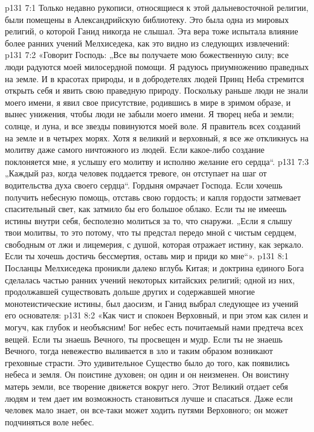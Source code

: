 \vs p131 7:1 Только недавно рукописи, относящиеся к этой дальневосточной религии, были помещены в Александрийскую библиотеку. Это была одна из мировых религий, о которой Ганид никогда не слышал. Эта вера тоже испытала влияние более ранних учений Мелхиседека, как это видно из следующих извлечений:
\vs p131 7:2 \pc «Говорит Господь: „Все вы получаете мою божественную силу; все люди радуются моей милосердной помощи. Я радуюсь приумножению праведных на земле. И в красотах природы, и в добродетелях людей Принц Неба стремится открыть себя и явить свою праведную природу. Поскольку раньше люди не знали моего имени, я явил свое присутствие, родившись в мире в зримом образе, и вынес унижения, чтобы люди не забыли моего имени. Я творец неба и земли; солнце, и луна, и все звезды повинуются моей воле. Я правитель всех созданий на земле и в четырех морях. Хотя я великий и верховный, я все же откликнусь на молитву даже самого ничтожного из людей. Если какое\hyp{}либо создание поклоняется мне, я услышу его молитву и исполню желание его сердца“.
\vs p131 7:3 „Каждый раз, когда человек поддается тревоге, он отступает на шаг от водительства духа своего сердца“. Гордыня омрачает Господа. Если хочешь получить небесную помощь, отставь свою гордость; и капля гордости затмевает спасительный свет, как затмило бы его большое облако. Если ты не имеешь истины внутри себя, бесполезно молиться за то, что снаружи. „Если я слышу твои молитвы, то это потому, что ты предстал передо мной с чистым сердцем, свободным от лжи и лицемерия, с душой, которая отражает истину, как зеркало. Если ты хочешь достичь бессмертия, оставь мир и приди ко мне“».
\vs p131 8:1 Посланцы Мелхиседека проникли далеко вглубь Китая; и доктрина единого Бога сделалась частью ранних учений некоторых китайских религий; одной из них, продолжавшей существовать дольше других и содержавшей многие монотеистические истины, был даосизм, и Ганид выбрал следующее из учений его основателя:
\vs p131 8:2 \pc «Как чист и спокоен Верховный, и при этом как силен и могуч, как глубок и необъясним! Бог небес есть почитаемый нами предтеча всех вещей. Если ты знаешь Вечного, ты просвещен и мудр. Если ты не знаешь Вечного, тогда невежество выливается в зло и таким образом возникают греховные страсти. Это удивительное Существо было до того, как появились небеса и земля. Он поистине духовен; он один и он неизменен. Он воистину матерь земли, все творение движется вокруг него. Этот Великий отдает себя людям и тем дает им возможность становиться лучше и спасаться. Даже если человек мало знает, он все\hyp{}таки может ходить путями Верховного; он может подчиняться воле небес.
